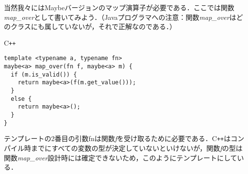 \documentclass[a5paper,draft]{jsbook}
\newcommand{\programminglanguage}[1]{\textsf{#1}}
\newcommand{\cxx}{\programminglanguage{C}\texttt{++}}
\newenvironment{cxxcode}{\begin{itembox}[r]{\cxx}}{\end{itembox}}
\newcommand{\pthnClassname}[1]{\textrm{#1}}
\newcommand{\pthnId}[1]{\textit{#1}}
\newcommand{\pthnKeyword}[1]{\textbf{#1}}
\begin{document}
当然我々にはMaybeバージョンのマップ演算子が必要である．ここでは関数\pthnId{map\_over}として書いてみよう．（Javaプログラマへの注意：関数\pthnId{map\_over}はどのクラスにも属していないが，それで正解なのである．）
\begin{cxxcode}
\begin{verbatim}
template <typename a, typename fn>
maybe<a> map_over(fn f, maybe<a> m) {
  if (m.is_valid()) {
    return maybe<a>(f(m.get_value()));
  }
  else {
    return maybe<a>();
  }
}
\end{verbatim}
\end{cxxcode}
テンプレートの2番目の引数\pthnClassname{fn}は関数\pthnId{f}を受け取るために必要である．\cxx はコンパイル時までにすべての変数の型が決定していないといけないが，関数\pthnId{f}の型は関数\pthnId{map\_over}設計時には確定できないため，このようにテンプレートにしている．
\end{document}
